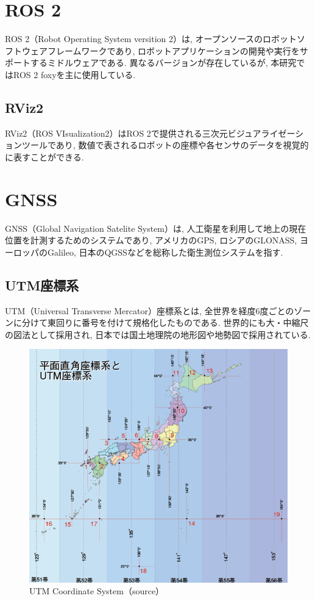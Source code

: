 
\section{ROS 2}
ROS 2（Robot Operating System versition 2）は, オープンソースのロボットソフトウェアフレームワークであり,
ロボットアプリケーションの開発や実行をサポートするミドルウェアである.
異なるバージョンが存在しているが, 本研究ではROS 2 foxyを主に使用している.

\subsection{RViz2}
RViz2（ROS VIsualization2）はROS 2で提供される三次元ビジュアライゼーションツールであり, 
数値で表されるロボットの座標や各センサのデータを視覚的に表すことができる.

\section{GNSS}
GNSS（Global Navigation Satelite System）は, 
人工衛星を利用して地上の現在位置を計測するためのシステムであり, 
アメリカのGPS, ロシアのGLONASS, ヨーロッパのGalileo, 日本のQGSSなどを総称した衛生測位システムを指す.

\subsection{UTM座標系}
UTM（Universal Transverse Mercator）座標系とは, 全世界を経度6度ごとのゾーンに分けて東回りに番号を付けて規格化したものである.
世界的にも大・中縮尺の図法として採用され, 日本では国土地理院の地形図や地勢図で採用されている.

\begin{figure}[H]
  \centering
 \includegraphics[keepaspectratio, scale=0.7]
      {images/UTMCoordinateSystem.png}
 \caption{UTM Coordinate System（source）}
 \label{fig:purepursuit}
\end{figure}

